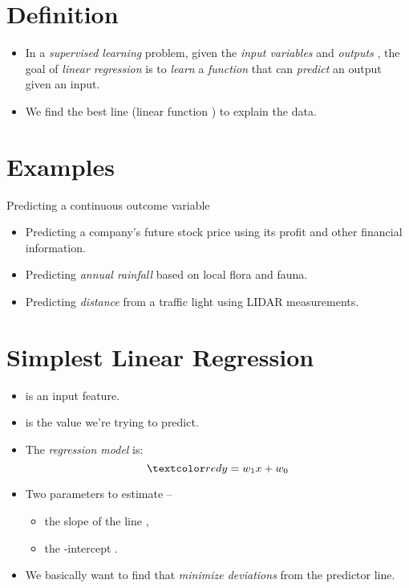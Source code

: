 \documentclass[
	number={5},
	title={Linear Regression}
]{cs584notes}
\begin{document}
\section{Definition}\label{sec:definition}
\begin{itemize}
	\item In a \emph{supervised learning} problem, given the \emph{input variables}  and \emph{outputs} , the goal of \emph{linear regression} is to \emph{learn} a \emph{function} that can \emph{predict} an output given an input.
	\item We find the best line (linear function ) to explain the data.
\end{itemize}

\section{Examples}\label{sec:examples}
Predicting a continuous outcome variable
\begin{itemize}
	\item Predicting a company's future stock price using its profit and other financial information.
	\item Predicting \emph{annual rainfall} based on local flora and fauna.
	\item Predicting \emph{distance} from a traffic light using LIDAR measurements.
\end{itemize}

\section{Simplest Linear Regression}\label{sec:simplest-linear-regression}
\begin{itemize}
	\item {} is an input feature.
	\item {} is the value we're trying to predict.
	\item The \emph{regression model} is:
	\[ \data{ y = w_{1}x + w_{0} } \]
	\item Two parameters to estimate --
	\begin{itemize}
		\item the slope of the line ,
		\item the -intercept .
	\end{itemize}
	\item We basically want to find  that \emph{minimize deviations} from the predictor line.
\end{itemize}
\end{document}
